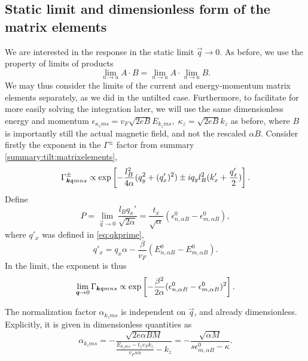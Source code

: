 \subsection{Static limit and dimensionless form of the matrix elements}
We are interested in the response in the static limit \( \vec{q} \to  0 \).
As before, we use the property of limits of products
\[
  \lim_{n \to a} A \cdot  B = \lim_{n \to a} A \cdot \lim_{n \to a} B.
\]
We may thus consider the limits of the current and energy-momentum matrix elements separately, as we did in the untilted case.
Furthermore, to facilitate for more easily solving the integration later, we will use the same dimensionless energy and momentum \( \epsilon_{\kappa_z m s} = v_F \sqrt{2 e B} E_{k_{z} m s}, \; \kappa_z = \sqrt{2 e B} k_{z}  \) as before, where \( B \) is importantly still the actual magnetic field, and not the rescaled \( \alpha B \).
Consider firstly the exponent in the \( \Gamma ^{\pm } \) factor from summary \ref{summary:tilt:matrixelements},
\[
  \Gamma^{\pm}_{\bm{k} \mathfrak{q} m n s} \propto
  \exp
  \left[
    - \frac{l_{B}^2}{4 \alpha } (q_{y}^2 + (q' _x)^2) \pm  i q_y l_B^2 (k' _x + \frac{q'_x}{2} )
  \right].
\]
Define
\begin{equation}
P = \lim_{\vec{q} \to 0} \frac{l_B q_x'}{\sqrt{2 \alpha } } = \frac{t_x}{\sqrt{\alpha}} (\epsilon^0_{n, \alpha B} - \epsilon^0_{m, \alpha B}),
\end{equation}
where \( q'_x \) was defined in \cref{eq:qkprime},
\begin{equation*}
  q' _x = q_x \alpha  - \frac{\beta}{v_{F} }( E^0_{n,\alpha B} - E^0_{m, \alpha B} ).
\end{equation*}
In the limit, the exponent is thus
\begin{equation}
  \lim_{\bm{q}\to 0} \Gamma_{\bm{k} \mathfrak{q} m n s} \propto
  \exp
  \left[
    - \frac{\beta ^2 }{2 \alpha} ( \epsilon ^0_{n,\alpha B} - \epsilon ^0_{m, \alpha B} )^2
  \right].
\end{equation}

The normalization factor \( \alpha_{k_z m s} \) is independent on \( \vec{q} \), and already dimensionless.
Explicitly, it is given in dimensionless quantities as
\begin{equation}
  \alpha_{k_z m s} =
  -\frac{\sqrt{2 e \alpha B M}}{ \frac{E_{k_{z} m s} - t_{\parallel} v_F k_z}{v_{F} s \alpha } - k_z}
  = -\frac{\sqrt{\alpha M}}{s \epsilon ^{0}_{m, \alpha B} - \kappa }.
\end{equation}

